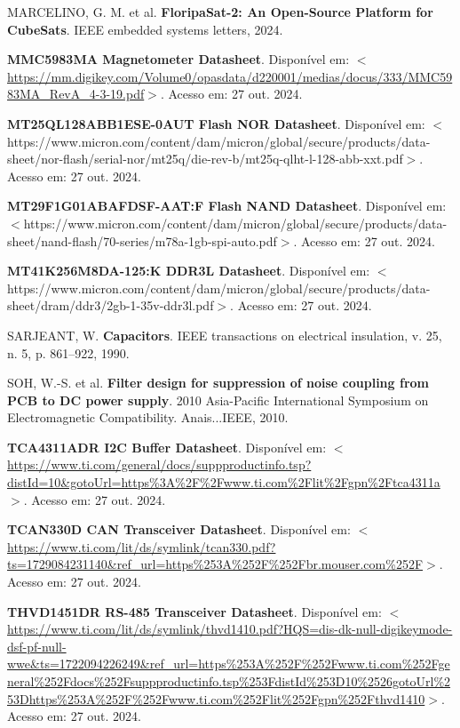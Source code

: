 \begin{flushleft}
\begin{thebibliography}{00}
 MARCELINO, G. M. et al. \textbf{FloripaSat-2: An Open-Source Platform for CubeSats}. IEEE embedded systems letters, 2024.

 \textbf{MMC5983MA Magnetometer Datasheet}. Disponível em: $<$\url{https://mm.digikey.com/Volume0/opasdata/d220001/medias/docus/333/MMC5983MA\_RevA\_4-3-19.pdf}$>$. Acesso em: 27 out. 2024. 

 \textbf{MT25QL128ABB1ESE-0AUT Flash NOR Datasheet}. Disponível em: $<$https://www.micron.com/content/dam/micron/global/secure/products/data-sheet/nor-flash/serial-nor/mt25q/die-rev-b/mt25q-qlht-l-128-abb-xxt.pdf$>$. Acesso em: 27 out. 2024. 

 \textbf{MT29F1G01ABAFDSF-AAT:F Flash NAND Datasheet}. Disponível em: $<$https://www.micron.com/content/dam/micron/global/secure/products/data-sheet/nand-flash/70-series/m78a-1gb-spi-auto.pdf$>$. Acesso em: 27 out. 2024. 

 \textbf{MT41K256M8DA-125:K DDR3L Datasheet}. Disponível em: $<$https://www.micron.com/content/dam/micron/global/secure/products/data-sheet/dram/ddr3/2gb-1-35v-ddr3l.pdf$>$. Acesso em: 27 out. 2024. 

 SARJEANT, W. \textbf{Capacitors}. IEEE transactions on electrical insulation, v. 25, n. 5, p. 861–922, 1990.

 SOH, W.-S. et al. \textbf{Filter design for suppression of noise coupling from PCB to DC power supply}. 2010 Asia-Pacific International Symposium on Electromagnetic Compatibility. Anais...IEEE, 2010.

 \textbf{TCA4311ADR I2C Buffer Datasheet}. Disponível em: $<$\url{https://www.ti.com/general/docs/suppproductinfo.tsp?distId=10\&gotoUrl=https\%3A\%2F\%2Fwww.ti.com\%2Flit\%2Fgpn\%2Ftca4311a}$>$. Acesso em: 27 out. 2024. 

 \textbf{TCAN330D CAN Transceiver Datasheet}. Disponível em: $<$\url{https://www.ti.com/lit/ds/symlink/tcan330.pdf?ts=1729084231140\&ref\_url=https\%253A\%252F\%252Fbr.mouser.com\%252F}$>$. Acesso em: 27 out. 2024. 

 \textbf{THVD1451DR RS-485 Transceiver Datasheet}. Disponível em: $<$\url{https://www.ti.com/lit/ds/symlink/thvd1410.pdf?HQS=dis-dk-null-digikeymode-dsf-pf-null-wwe\&ts=1722094226249\&ref\_url=https\%253A\%252F\%252Fwww.ti.com\%252Fgeneral\%252Fdocs\%252Fsuppproductinfo.tsp\%253FdistId\%253D10\%2526gotoUrl\%253Dhttps\%253A\%252F\%252Fwww.ti.com\%252Flit\%252Fgpn\%252Fthvd1410}$>$. Acesso em: 27 out. 2024. 


\end{thebibliography}
\end{flushleft}
